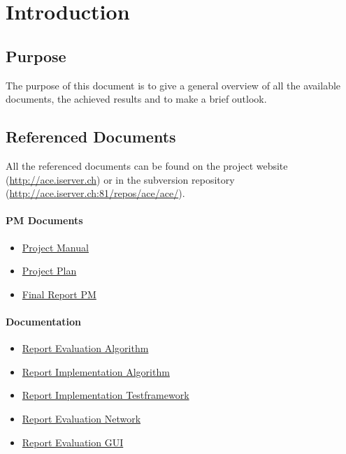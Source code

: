\documentclass[11pt,a4paper]{article}
\begin{document}
\setlength{\parindent}{0pt}


\newpage

\tableofcontents
\newpage

\listoftables
\listoffigures
\newpage


\section{Introduction}
\subsection{Purpose}
The purpose of this document is to give a general overview of all the available documents, the achieved results and to make a brief outlook.

\subsection{Referenced Documents}
All the referenced documents can be found on the project website (\href{http://ace.iserver.ch/}{http://ace.iserver.ch}) or in the subversion repository (\href{http://ace.iserver.ch:81/repos/ace/ace/}{http://ace.iserver.ch:81/repos/ace/ace/}).

\paragraph{PM Documents}
\begin{itemize}
 \item \href{http://ace.iserver.ch:81/repos/ace/ace/trunk/doc/pdf/projectmanual.pdf}{Project Manual}
 \item \href{http://ace.iserver.ch:81/repos/ace/ace/trunk/doc/pdf/projektplan.pdf}{Project Plan}
 \item \href{http://ace.iserver.ch:81/repos/ace/ace/trunk/doc/pdf/erfahrungsbericht.pdf}{Final Report PM}
\end{itemize}

\paragraph{Documentation}
\begin{itemize}
 \item \href{http://ace.iserver.ch:81/repos/ace/ace/trunk/doc/pdf/algorithm.pdf}{Report Evaluation Algorithm}
 \item \href{http://ace.iserver.ch:81/repos/ace/ace/trunk/doc/pdf/implementation-algorithm.pdf}{Report Implementation Algorithm}
 \item \href{http://ace.iserver.ch:81/repos/ace/ace/trunk/doc/pdf/testframework.pdf}{Report Implementation Testframework}
 \item \href{http://ace.iserver.ch:81/repos/ace/ace/trunk/doc/pdf/network.pdf}{Report Evaluation Network}
 \item \href{http://ace.iserver.ch:81/repos/ace/ace/trunk/doc/pdf/gui.pdf}{Report Evaluation GUI}
\end{itemize}
\end{document}
